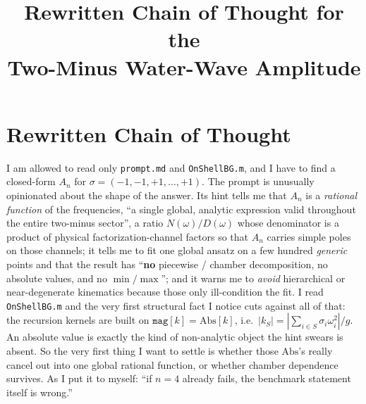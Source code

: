 \documentclass{article}
\title{Rewritten Chain of Thought for the\\
Two-Minus Water-Wave Amplitude}
\author{}
\date{}
\begin{document}
\maketitle


\section*{Rewritten Chain of Thought}

I am allowed to read only \texttt{prompt.md} and \texttt{OnShellBG.m}, and I have
to find a closed-form $A_n$ for $\sigma=(-1,-1,+1,\dots,+1)$. The prompt is
unusually opinionated about the shape of the answer. Its hint tells me that
$A_n$ is a \emph{rational function} of the frequencies, ``a single global,
analytic expression valid throughout the entire two-minus sector'', a ratio
$N(\omega)/D(\omega)$ whose denominator is a product of physical
factorization-channel factors so that $A_n$ carries simple poles on those
channels; it tells me to fit one global ansatz on a few hundred \emph{generic}
points and that the result has ``\textbf{no} piecewise / chamber decomposition,
no absolute values, and no $\min/\max$''; and it warns me to \emph{avoid}
hierarchical or near-degenerate kinematics because those only ill-condition the
fit. I read \texttt{OnShellBG.m} and the very first structural fact I notice cuts
against all of that: the recursion kernels are built on $\texttt{mag}[k]=
\mathrm{Abs}[k]$, i.e.\ $|k_S|=|\sum_{i\in S}\sigma_i\omega_i^2|/g$. An absolute
value is exactly the kind of non-analytic object the hint swears is absent. So
the very first thing I want to settle is whether those $\mathrm{Abs}$'s really
cancel out into one global rational function, or whether chamber dependence
survives. As I put it to myself: ``if $n=4$ already fails, the benchmark
statement itself is wrong.''
\end{document}
